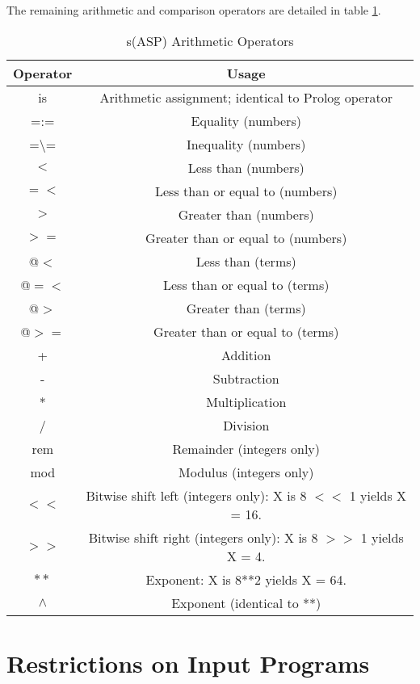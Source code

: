 \documentclass[]{article}
\begin{document}
The remaining arithmetic and comparison operators are detailed in table \ref{tab:operators}.

\begin{table}[htb]
	\begin{tabular}{|c|c|}
		\hline Operator & Usage \\ 
		\hline is & Arithmetic assignment; identical to Prolog operator \\ 
		\hline =:= & Equality (numbers) \\
		\hline =\textbackslash = & Inequality (numbers) \\
		\hline $<$ & Less than (numbers) \\
		\hline $=<$ & Less than or equal to (numbers) \\
		\hline $>$ & Greater than (numbers) \\
		\hline $>=$ & Greater than or equal to (numbers) \\
		\hline @$<$ & Less than (terms) \\
		\hline @$=<$ & Less than or equal to (terms) \\
		\hline @$>$ & Greater than (terms) \\
		\hline @$>=$ & Greater than or equal to (terms) \\
		\hline + & Addition \\
		\hline - & Subtraction \\
		\hline * & Multiplication \\
		\hline / & Division \\
		\hline rem & Remainder (integers only) \\
		\hline mod & Modulus (integers only) \\
		\hline $<<$ & Bitwise shift left (integers only): X is 8 $<<$ 1 yields X = 16. \\
		\hline $>>$ & Bitwise shift right (integers only): X is 8 $>>$ 1 yields X = 4. \\
		\hline $**$ & Exponent: X is 8**2 yields X = 64. \\
		\hline $\wedge$ & Exponent (identical to **) \\
		\hline 
	\end{tabular}
	\caption{s(ASP) Arithmetic Operators}
	\label{tab:operators}
\end{table}


\section{Restrictions on Input Programs}
\end{document}

